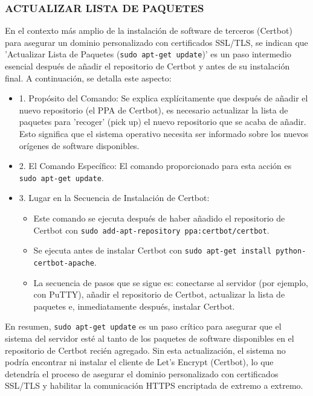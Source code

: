\documentclass{report}
\begin{document}
\subsubsection{ACTUALIZAR LISTA DE PAQUETES}
En el contexto más amplio de la instalación de software de terceros (Certbot) para asegurar un dominio personalizado con 
certificados SSL/TLS, se  indican que 'Actualizar Lista de Paquetes (\verb|sudo apt-get update|)' es un paso 
intermedio esencial después de añadir el repositorio de Certbot y antes de su instalación final.
A continuación, se detalla este aspecto:
\begin{itemize}
    \item 1. Propósito del Comando: Se explica explícitamente que después de añadir el nuevo repositorio (el PPA de Certbot), 
    es necesario actualizar la lista de paquetes para 'recoger' (pick up) el nuevo repositorio que se acaba de añadir. Esto significa que 
    el sistema operativo necesita ser informado sobre los nuevos orígenes de software disponibles.
    \item 2. El Comando Específico: El comando proporcionado para esta acción es \verb|sudo apt-get update|.
    \item 3. Lugar en la Secuencia de Instalación de Certbot:
        \begin{itemize}
            \item Este comando se ejecuta después de haber añadido el repositorio de Certbot con \verb|sudo add-apt-repository ppa:certbot/certbot|.
            \item Se ejecuta antes de instalar Certbot con \verb|sudo apt-get install python-certbot-apache|.
            \item La secuencia de pasos que se sigue es: conectarse al servidor (por ejemplo, con PuTTY), añadir el repositorio de Certbot, 
            actualizar la lista de paquetes e, inmediatamente después, instalar Certbot.
        \end{itemize}
\end{itemize}
En resumen, \verb|sudo apt-get update| es un paso crítico para asegurar que el sistema del servidor esté al tanto de los paquetes 
de software disponibles en el repositorio de Certbot recién agregado. Sin esta actualización, el sistema no podría encontrar ni 
instalar el cliente de Let's Encrypt (Certbot), lo que detendría el proceso de asegurar el dominio personalizado con certificados 
SSL/TLS y habilitar la comunicación HTTPS encriptada de extremo a extremo.
\end{document}
